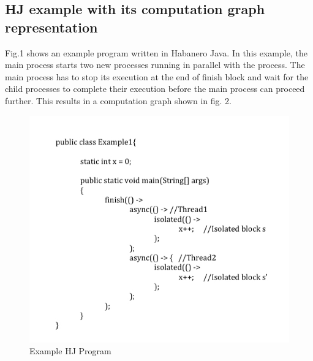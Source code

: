 \subsection{HJ example with its computation graph representation}
Fig.1 shows an example program written in Habanero Java. In this example, the main process starts two new processes running in parallel with the process. The main process has to stop its execution at the end of finish block and wait for the child processes to complete their execution before the main process can proceed further. This results in a computation graph shown in fig. 2. 

\begin{figure}[h!]
  \caption{Example HJ Program}
    \includegraphics[scale=0.5]{../figs/Fig1.jpg} 
\end{figure}
